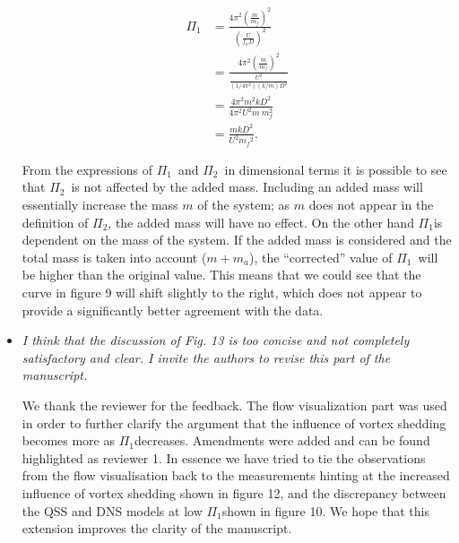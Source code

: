 \documentclass[]{article}
\newcommand{\massstiff}{\ensuremath{\Pi_1}}
\newcommand{\massdamp}{\ensuremath{\Pi_2}}
\begin{document}
\begin{itemize}
\begin{align*}
	 \massstiff &= \frac{4 {\pi}^2 {\left(\frac{m}{m_f}\right)}^2}{{\left(\frac{U}{{f_n} D}\right)}^2} \\
	 & = \frac{4 {\pi}^2 {\left(\frac{m}{m_f}\right)}^2}{{\frac{U^2}{{(1/4{\pi}^2)(k/m)} D^2}}} \\
     & = \frac{4{\pi}^2 m^2 k D^2}{4 {\pi}^2 U^2 m \ m _f^2} \\
     & = \frac{m k D^2}{U^2 {m_f}^2} .
\end{align*}

From the expressions of \massstiff \ and \massdamp \ in dimensional terms it is possible to see that \massdamp \ is not affected by the added mass. Including an added mass will essentially increase the mass $m$ of the system; as $m$ does not appear in the definition of \massdamp, the added mass will have no effect. On the other hand \massstiff is dependent on the mass of the system. If the added mass is considered and the total mass is taken into account ($m+m_a$), the ``corrected'' value of \massstiff\ will be higher than the original value. This means that we could see that the curve in figure 9 will shift slightly to the right, which does not appear to provide a significantly better agreement with the data. 
 
\item \emph{ I think that the discussion of Fig. 13 is too concise and not completely satisfactory and clear. I invite the authors to revise this part of the manuscript.}

We thank the reviewer for the feedback. The flow visualization part was used in order to further clarify the argument that the influence of vortex shedding becomes more as \massstiff decreases. Amendments were added and can be found highlighted as reviewer 1. In essence we have tried to tie the observations from the flow visualisation back to the measurements hinting at the increased influence of vortex shedding shown in figure 12, and the discrepancy between the QSS and DNS models at low \massstiff shown in figure 10. We hope that this extension improves the clarity of the manuscript.

\end{itemize}
\end{document}
